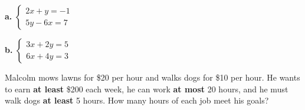 \vspace{-10pt}
\begin{minipage}[t]{0.48\textwidth}\vspace{0pt}
\textbf{a.} $\begin{cases} 2x+y=-1\\ 5y-6x=7\end{cases}$
\end{minipage}\hfill
\begin{minipage}[t]{0.48\textwidth}\vspace{0pt}
\textbf{b.} $\begin{cases} 3x+2y=5\\ 6x+4y=3\end{cases}$\end{minipage}\vspace{-12pt}
\twolines[4]

\newpage

Malcolm mows lawns for \$20 per hour and walks dogs for \$10 per hour. He wants to earn \textbf{at least} \$200 each week, he can work \textbf{at most} 20 hours, and he must walk dogs \textbf{at least} 5 hours. How many hours of each job meet his goals?


